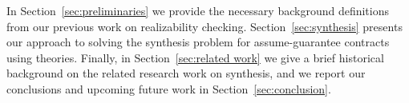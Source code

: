 In Section~\ref{sec:preliminaries} we provide the necessary background
definitions from our previous work on realizability checking.
Section~\ref{sec:synthesis} presents our approach to solving the synthesis
problem for assume-guarantee contracts using theories. Finally, in
Section~\ref{sec:related work} we give a brief historical background on the
related research work on synthesis, and we report our conclusions and upcoming
future work in Section~\ref{sec:conclusion}.
